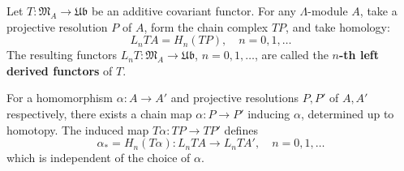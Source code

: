 Let $T : \mathfrak{M}_A \rightarrow \mathfrak{Ub}$ be an additive covariant functor. For any $\Lambda$-module $A$, take a projective resolution $P$ of $A$, form the chain complex $TP$, and take homology:
$$L_n TA = H_n(TP), \quad n = 0, 1, \ldots$$
The resulting functors $L_n T : \mathfrak{M}_A \rightarrow \mathfrak{Ub}$, $n = 0, 1, \ldots$, are called the \textbf{$n$-th left derived functors} of $T$.

For a homomorphism $\alpha : A \rightarrow A'$ and projective resolutions $P, P'$ of $A, A'$ respectively, there exists a chain map $\alpha : P \rightarrow P'$ inducing $\alpha$, determined up to homotopy. The induced map $T\alpha : TP \rightarrow TP'$ defines
$$\alpha_* = H_n(T\alpha) : L_n TA \rightarrow L_n TA', \quad n = 0, 1, \ldots$$
which is independent of the choice of $\alpha$.
